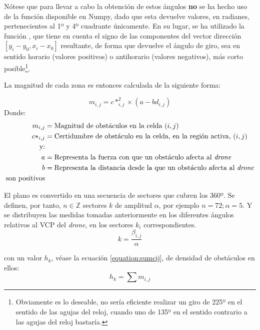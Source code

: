 Nótese que para llevar a cabo la obtención de estos ángulos \textbf{no} se ha hecho uso de la función  disponible en Numpy, dado que esta devuelve valores, en radianes, pertenecientes al 1º y 4º cuadrante únicamente. En su lugar, se ha utilizado la función , que tiene en cuenta el signo de las componentes del vector dirección $ [y_i - y_0 , x_i - x_0]$ resultante, de forma que devuelve el ángulo de giro, sea en sentido horario (valores positivos) o antihorario (valores negativos), más corto posible\footnote{Obviamente es lo deseable, no sería eficiente realizar un giro de 225º en el sentido de las agujas del reloj, cuando uno de 135º en el sentido contrario a las agujas del reloj bastaría.}.


La magnitud de cada zona es entonces calculada de la siguiente forma:

\begin{equation}
\label{equation:mij}
m_{i,j} = c*_{i,j}^2 \times (a-bd_{i,j})
\end{equation}
Donde: 
\begin{align*}
m_{i,j}  &= \text{Magnitud de obstáculos en la celda $(i,j)$}\\
c*_{i,j} &= \text{Certidumbre de obstáculo en la celda, en la región activa, $(i,j)$}\\
\text{y:} \\
a &= \text{Representa la fuerza con que un obstáculo afecta al \emph{drone}}\\
b &= \text{Representa la distancia desde la que un obstáculo afecta al \emph{drone}}\\
\text{son positivos}
\end{align*}

El plano es convertido en una secuencia de sectores que cubren los 360º. Se definen, por tanto, $n \in \mathbb{Z}$ sectores $k$ de amplitud $\alpha$, por ejemplo $n=72; \alpha=5$. Y se distribuyen las medidas tomadas anteriormente en los diferentes ángulos relativos al VCP del \emph{drone}, en los sectores $k_i$ correspondientes.
\begin{equation}
\label{equation:betatok}
k =\frac{\beta_{i,j}}{\alpha}
\end{equation}

\noindent con un valor $h_k$, véase la ecuación \ref{equation:sumcij}, de densidad de obstáculos en ellos:
\begin{equation}
\label{equation:sumcij}
h_k = \sum m_{i,j}
\end{equation}

